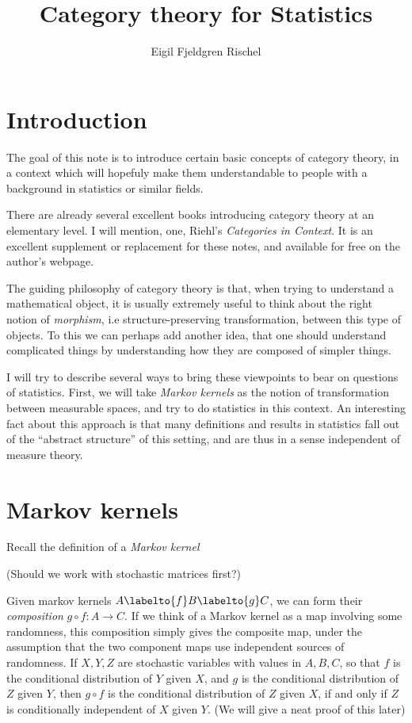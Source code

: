 \documentclass{article}
\title{Category theory for Statistics}
\author{Eigil Fjeldgren Rischel}
\date{}
\begin{document}
\maketitle
\section{Introduction}

The goal of this note is to introduce certain basic concepts of category theory, in a context which will hopefuly make them understandable to people with a background in statistics or similar fields.

There are already several excellent books introducing category theory at an elementary level. I will mention, one, Riehl's \emph{Categories in Context}.
It is an excellent supplement or replacement for these notes, and available for free on the author's webpage.

The guiding philosophy of category theory is that, when trying to understand a mathematical object, it is usually extremely useful to think about the right notion of \emph{morphism}, i.e structure-preserving transformation, between this type of objects.
To this we can perhaps add another idea, that one should understand complicated things by understanding how they are composed of simpler things.

I will try to describe several ways to bring these viewpoints to bear on questions of statistics. First, we will take \emph{Markov kernels} as the notion of transformation between measurable spaces, and try to do statistics in this context.
An interesting fact about this approach is that many definitions and results in statistics fall out of the ``abstract structure'' of this setting, and are thus in a sense independent of measure theory.

\section{Markov kernels}
Recall the definition of a \emph{Markov kernel}

(Should we work with stochastic matrices first?)

Given markov kernels $A \labelto{f} B \labelto{g} C$, we can form their \emph{composition} $g\circ f: A \to C$.
If we think of a Markov kernel as a map involving some randomness, this composition simply gives the composite map, under the assumption that the two component maps use independent sources of randomness.
If $X, Y, Z$ are stochastic variables with values in $A,B,C$, so that $f$ is the conditional distribution of $Y$ given $X$, and $g$ is the conditional distribution of $Z$ given $Y$, then $g\circ f$ is the conditional distribution of $Z$ given $X$, if and only if $Z$ is conditionally independent of $X$ given $Y$. (We will give a neat proof of this later)
\end{document}

